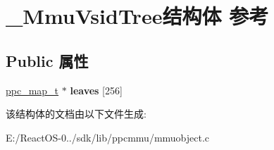 \hypertarget{struct___mmu_vsid_tree}{}\section{\+\_\+\+Mmu\+Vsid\+Tree结构体 参考}
\label{struct___mmu_vsid_tree}
\subsection*{Public 属性}
\begin{DoxyCompactItemize}
\item 
\mbox{\label{struct___mmu_vsid_tree_ab58adf91e7e6ea2cffef9707b5ec58c5}} 
\hyperlink{struct__ppc__map__t}{ppc\+\_\+map\+\_\+t} $\ast$ {\bfseries leaves} \mbox{[}256\mbox{]}
\end{DoxyCompactItemize}


该结构体的文档由以下文件生成\+:\begin{DoxyCompactItemize}
\item 
E\+:/\+React\+O\+S-\/0../sdk/lib/ppcmmu/mmuobject.\+c\end{DoxyCompactItemize}
